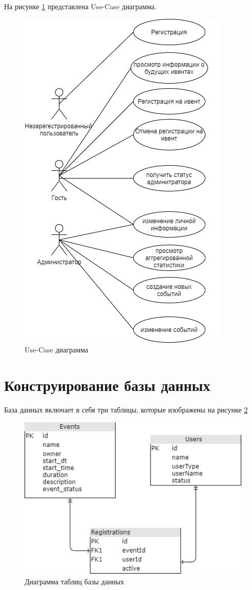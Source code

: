 \documentclass[12pt,a4paper,oneside]{report}
\begin{document}
\quad На рисунке \ref{ris:case} представлена Use-Case диаграмма. 
\begin{figure}[h]
	\centering
	\includegraphics[scale=1.2]{UseCasediagram.png}
	\caption{Use-Case диаграмма}
	\label{ris:case}
\end{figure}
\clearpage


\section{Конструирование базы данных}
База данных включает в себя три таблицы, которые изображены на рисунке  \ref{ris:dbdiagram}
\begin{figure}[h]
	\centering
	\includegraphics[scale=1.2]{diagram.png}
	\caption{Диаграмма таблиц базы данных}
	\label{ris:dbdiagram}
\end{figure}
\end{document}
